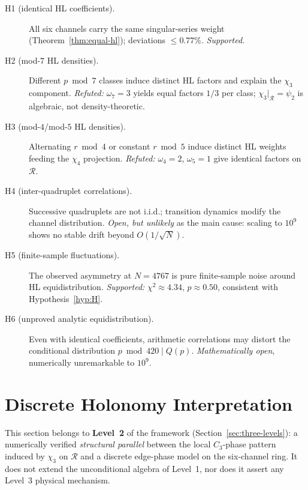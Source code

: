 \documentclass[11pt,a4paper]{article}
\newcommand{\R}{\mathcal{R}}
\begin{document}
\begin{description}
  \item[H1 (identical HL coefficients).]
        All six channels carry the same singular-series weight
        (Theorem~\ref{thm:equal-hl}); deviations $\le 0.77\%$.
        \emph{Supported.}
  \item[H2 (mod-$7$ HL densities).]
        Different $p\bmod 7$ classes induce distinct HL factors and
        explain the $\chi_3$ component.
        \emph{Refuted:} $\omega_7=3$ yields equal factors $1/3$ per class;
        $\chi_3|_{\R}=\psi_2$ is algebraic, not density-theoretic.
  \item[H3 (mod-$4$/mod-$5$ HL densities).]
        Alternating $r\bmod 4$ or constant $r\bmod 5$ induce distinct HL
        weights feeding the $\chi_4$ projection.
        \emph{Refuted:} $\omega_4=2$, $\omega_5=1$ give identical factors
        on $\R$.
  \item[H4 (inter-quadruplet correlations).]
        Successive quadruplets are not i.i.d.; transition dynamics modify
        the channel distribution.
        \emph{Open, but unlikely} as the main cause: scaling to $10^9$
        shows no stable drift beyond $O(1/\sqrt{N})$.
  \item[H5 (finite-sample fluctuations).]
        The observed asymmetry at $N=4767$ is pure finite-sample noise
        around HL equidistribution.
        \emph{Supported:} $\chi^2\approx 4.34$, $p\approx 0.50$,
        consistent with Hypothesis~\ref{hyp:H}.
  \item[H6 (unproved analytic equidistribution).]
        Even with identical coefficients, arithmetic correlations may
        distort the conditional distribution $p\bmod 420\mid Q(p)$.
        \emph{Mathematically open}, numerically unremarkable to $10^9$.
\end{description}

\section{Discrete Holonomy Interpretation}
\label{sec:holonomy}

This section belongs to \textbf{Level~2} of the framework
(Section~\ref{sec:three-levels}): a numerically verified \emph{structural
parallel} between the local $C_3$-phase pattern induced by $\chi_3$ on $\R$
and a discrete edge-phase model on the six-channel ring.
It does not extend the unconditional algebra of Level~1, nor does it assert
any Level~3 physical mechanism.
\end{document}
